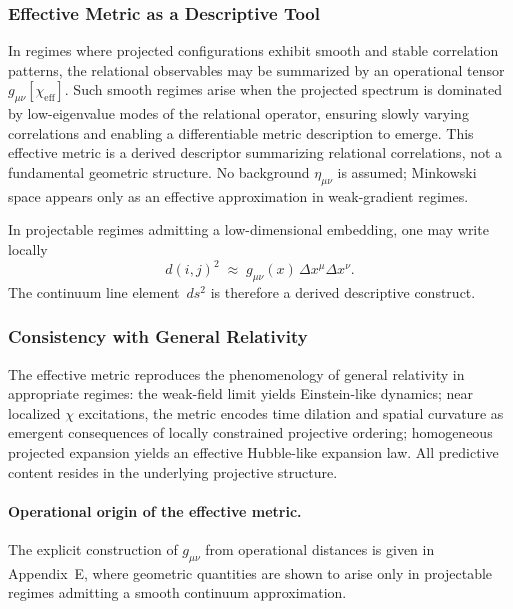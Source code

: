   \subsubsection*{Effective Metric as a Descriptive Tool}

    In regimes where projected configurations exhibit smooth and stable
    correlation patterns, the relational observables may be summarized by an
    operational tensor $g_{\mu\nu}[\chi_{\mathrm{eff}}]$.
    Such smooth regimes arise when the projected spectrum is dominated by
    low-eigenvalue modes of the relational operator, ensuring slowly varying
    correlations and enabling a differentiable metric description to emerge.
    This effective metric is a derived descriptor summarizing relational
    correlations, not a fundamental geometric structure.
    No background $\eta_{\mu\nu}$ is assumed; Minkowski space appears only as an
    effective approximation in weak-gradient regimes.

    In projectable regimes admitting a low-dimensional embedding, one may write
    locally
    \[
      d(i,j)^2 \;\approx\;
      g_{\mu\nu}(x)\,\Delta x^\mu \Delta x^\nu .
    \]
    The continuum line element~$ds^2$ is therefore a derived descriptive
    construct.

  \subsubsection*{Consistency with General Relativity}

    The effective metric reproduces the phenomenology of general relativity in
    appropriate regimes: the weak-field limit yields Einstein-like dynamics; near
    localized $\chi$ excitations, the metric encodes time dilation and spatial
    curvature as emergent consequences of locally constrained projective ordering;
    homogeneous projected expansion yields an effective Hubble-like expansion law.
    All predictive content resides in the underlying projective structure.

    \paragraph{Operational origin of the effective metric.}
      The explicit construction of $g_{\mu\nu}$ from operational distances is
      given in Appendix~E, where geometric quantities are shown to arise only in
      projectable regimes admitting a smooth continuum approximation.
